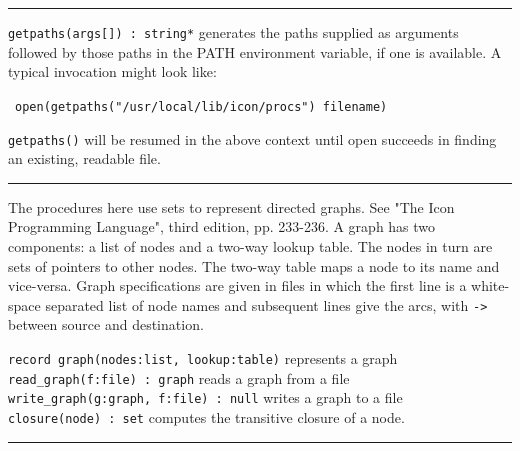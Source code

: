 \vspace{0.25cm}\hrule{}

\texttt{getpaths(args[]) : string*} generates the paths supplied as
arguments followed by those paths in the PATH environment variable, if one is available. A typical
invocation might look like:

\ \texttt{open(getpaths("/usr/local/lib/icon/procs")
{\textbar}{\textbar} filename)}

\texttt{getpaths()} will be resumed in the above context until open
succeeds in finding an existing, readable file.

\vspace{0.25cm}\hrule{}

The procedures here use sets to represent directed graphs.
See "The Icon Programming Language", third
edition, pp. 233-236. A graph has two components: a list of nodes and a
two-way lookup table. The nodes in turn are sets of
pointers to other nodes. The two-way table maps a node
to its name and vice-versa. Graph specifications are given in files in
which the first line is a white-space separated list of node names and
subsequent lines give the arcs, with \texttt{-\textgreater} between
source and destination. %


\texttt{record graph(nodes:list, lookup:table)} represents a graph\\
\texttt{read\_graph(f:file) : graph} reads a graph from a file\\
\texttt{write\_graph(g:graph, f:file) : null} writes a graph to a file\\
\texttt{closure(node) : set} computes the transitive closure of a node.
\ \ \ \ \ \ 

\vspace{0.25cm}\hrule{}

